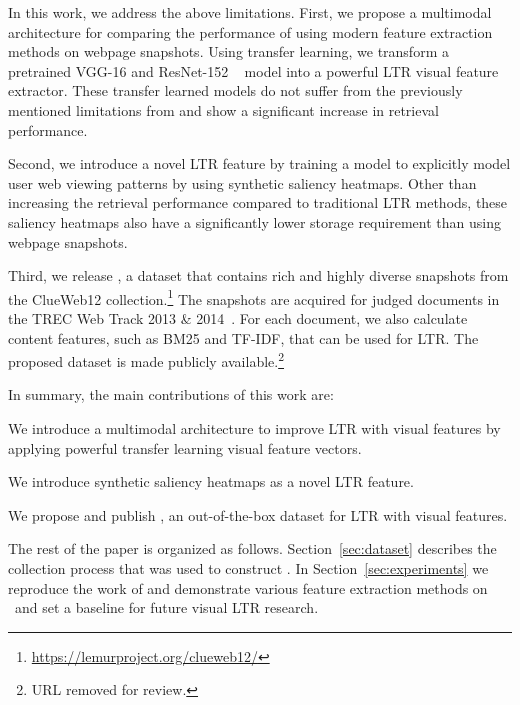 In this work, we address the above limitations.
First, we propose a multimodal architecture for comparing the performance of using modern feature extraction methods on webpage snapshots. Using transfer learning, we transform a pretrained VGG-16 and ResNet-152 ~\cite{simonyan2014very, he2016deep} model into a powerful \ac{LTR} visual feature extractor. These transfer learned models do not suffer from the previously mentioned limitations from \cite{fan2017learning} and show a significant increase in retrieval performance.

Second, we introduce a novel \ac{LTR} feature by training a model to explicitly model user web viewing patterns by using synthetic saliency heatmaps. Other than increasing the retrieval performance compared to traditional \ac{LTR} methods, these saliency heatmaps also have a significantly lower storage requirement than using webpage snapshots.

Third, we release \datasetname, a dataset that contains rich and highly diverse snapshots from the ClueWeb12 collection.\footnote{\url{https://lemurproject.org/clueweb12/}} The snapshots are acquired for judged documents in the TREC Web Track 2013 \& 2014~\cite{collins2013trec,collins2015trec}. For each document, we also calculate content features, such as BM25 and TF-IDF, that can be used for \ac{LTR}.
The proposed dataset is made publicly available.\footnote{URL removed for review.}
%


In summary, the main contributions of this work are:
\begin{inparaenum}[(i)]
\item We introduce a multimodal architecture to improve \ac{LTR} with visual features by applying powerful transfer learning visual feature vectors.
\item We introduce synthetic saliency heatmaps as a novel \ac{LTR} feature. 
\item We propose and publish \datasetname, an out-of-the-box dataset for \ac{LTR} with visual features.
\end{inparaenum}

 The rest of the paper is organized as follows. Section~\ref{sec:dataset} describes the collection process that was used to construct \datasetname. In Section~\ref{sec:experiments} we reproduce the work of \citet{fan2017learning} and demonstrate various feature extraction methods on \datasetname~and set a baseline for future visual \ac{LTR} research.  
\fi